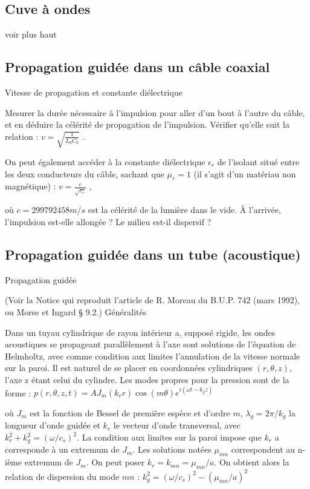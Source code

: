 \documentclass{article}%
\begin{document}
\subsection{Cuve à ondes}

voir plus haut

\subsection{Propagation guidée dans un câble coaxial}

Vitesse de propagation et constante diélectrique

Mesurer la durée nécessaire à l'impulsion pour aller d'un bout à l'autre du câble, et en déduire la célérité de propagation de l'impulsion. Vérifier qu'elle suit la relation :
$v = \sqrt {\frac{1}{L_0 C_0 }}$ .

On peut également accéder à la constante diélectrique $\epsilon_r$ de l'isolant situé entre les deux conducteurs du câble, sachant que $\mu_{r} = 1$ (il s'agit d'un matériau non magnétique) :
$v = \frac{c}{\sqrt {\varepsilon _r } }$ ,

où $c = 299 792 458 m/s$ est la célérité de la lumière dans le vide. À l'arrivée, l'impulsion est-elle allongée ? Le milieu est-il dispersif ?


\subsection{Propagation guidée dans un tube (acoustique)}

Propagation guidée

(Voir la Notice qui reproduit l'article de R. Moreau du B.U.P. 742 (mars 1992), ou Morse et Ingard § 9.2.)
Généralités

Dans un tuyau cylindrique de rayon intérieur a, supposé rigide, les ondes acoustiques se propageant parallèlement à l'axe sont solutions de l'équation de Helmholtz, avec comme condition aux limites l'annulation de la vitesse normale sur la paroi. Il est naturel de se placer en coordonnées cylindriques $(r,\theta,z)$, l'axe z étant celui du cylindre. Les modes propres pour la pression sont de la forme :
$ p(r,\theta,z,t) = A J_{m}(k_{r}r) \cos (m \theta)e^{i(\omega t - k_{g} z)}$

où $J_{m}$ est la fonction de Bessel de première espèce et d'ordre $m$, $\lambda_{g} = 2\pi/k_{g}$ la longueur d'onde guidée et $k_{r}$ le vecteur d'onde transversal, avec $k_{r}^2 + k_{g}^2 = (\omega/c_s)^2$. La condition aux limites sur la paroi impose que $k_{r}$ a corresponde à un extremum de $J_{m}$. Les solutions notées $\mu_{mn}$ correspondent au n-ième extremum de $J_{m}$. On peut poser $k_{r} = k_{mn}= \mu_{mn}/a$. On obtient alors la relation de dispersion du mode $mn$ :
$ k_{g}^2 = (\omega/c_s)^2 - (\mu_{mn}/a)^2$
\end{document}
